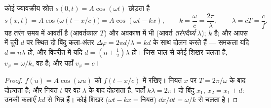 \begin{proposition}[ज्यावक्रीय प्रगामी तरंग]\label{prop:b1:wave-propagation:sinusoidal}
कोई ज्यावक्रीय स्रोत $s(0, t) = A\cos(\omega t)$ छोड़ता है
\[
s(x, t) = A\cos\!\big(\omega(t - x/c)\big) = A\cos(\omega t - kx),
\qquad k = \frac{\omega}{c} = \frac{2\pi}{\lambda},
\qquad \lambda = cT = \frac{c}{f}.
\]
यह तरंग समय में आवर्ती है (आवर्तकाल $T$) और अवकाश में भी (आवर्त
\emph{तरंगदैर्घ्य} $\lambda$); $k$ \emph{} है; और आपस में
दूरी $d$ पर स्थित दो बिंदु कला-अंतर
$\Delta\varphi = 2\pi d/\lambda = kd$ के साथ दोलन करते हैं --- समकला यदि
$d = n\lambda$ हो, और विपरीत  में यदि
$d = (n + \tfrac12)\lambda$ हो। जिस चाल से कोई शिखर चलता है,
$v_\varphi = \omega/k$, वह \emph{} है; और
यहाँ $v_\varphi = c$।
\end{proposition}

\begin{proof}
$f(u) = A\cos(\omega u)$ को $f(t - x/c)$ में रखिए। नियत $x$ पर
 $T = 2\pi/\omega$ के बाद दोहराता है; और नियत $t$ पर वह
$\lambda$ के बाद दोहराता है, जहाँ $k\lambda = 2\pi$। दो बिंदु $x_1$,
$x_2 = x_1 + d$: उनकी कलाएँ $kd$ से भिन्न हैं। कोई शिखर
($\omega t - kx = \text{नियत}$)
$\dd x/\dd t = \omega/k$ से चलता है।
\end{proof}

